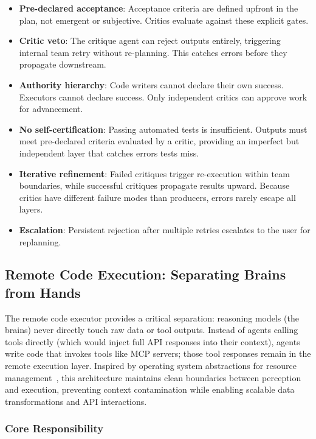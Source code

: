 \documentclass[sigconf]{acmart}
\begin{document}
\begin{itemize}
  \item \textbf{Pre-declared acceptance}: Acceptance criteria are defined upfront in the plan, not emergent or subjective. Critics evaluate against these explicit gates.
  \item \textbf{Critic veto}: The critique agent can reject outputs entirely, triggering internal team retry without re-planning. This catches errors before they propagate downstream.
  \item \textbf{Authority hierarchy}: Code writers cannot declare their own success. Executors cannot declare success. Only independent critics can approve work for advancement.
  \item \textbf{No self-certification}: Passing automated tests is insufficient. Outputs must meet pre-declared criteria evaluated by a critic, providing an imperfect but independent layer that catches errors tests miss.
  \item \textbf{Iterative refinement}: Failed critiques trigger re-execution within team boundaries, while successful critiques propagate results upward. Because critics have different failure modes than producers, errors rarely escape all layers.
  \item \textbf{Escalation}: Persistent rejection after multiple retries escalates to the user for replanning.
\end{itemize}

\subsection{Remote Code Execution: Separating Brains from Hands}
\label{sec:data-kernel}

The remote code executor provides a critical separation: reasoning models (the brains) never directly touch raw data or tool outputs. Instead of agents calling tools directly (which would inject full API responses into their context), agents write code that invokes tools like MCP servers; those tool responses remain in the remote execution layer. Inspired by operating system abstractions for resource management~\cite{Mei2024AIOS}, this architecture maintains clean boundaries between perception and execution, preventing context contamination while enabling scalable data transformations and API interactions.

\subsubsection{Core Responsibility}
\end{document}

